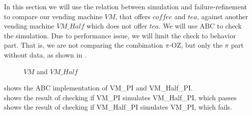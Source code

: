 In this section we will use the relation between simulation and failure-refinement  to compare our vending machine $VM$, that offers $coffee$ and $tea$, against another vending machine $VM\_Half$ which does not offer $tea$. We will use ABC to check the simulation. Due to performance issue, we will limit the check to behavior part. That is, we are not comparing the combination $\pi$-OZ, but only the $\pi$ part   without data, as shown in .
\begin{figure}[H]%
\centering
{}%
\qquad
{}%
\caption{$VM$ and $VM\_Half$}
\label{vm_and_vmHalf}
\end{figure}

 shows the ABC implementation of VM\_PI and VM\_Half\_PI.\\
 shows the result of checking if VM\_PI simulates VM\_Half\_PI, which passes\\
 shows the result of checking if VM\_Half\_PI simulates  VM\_PI, which fails.









